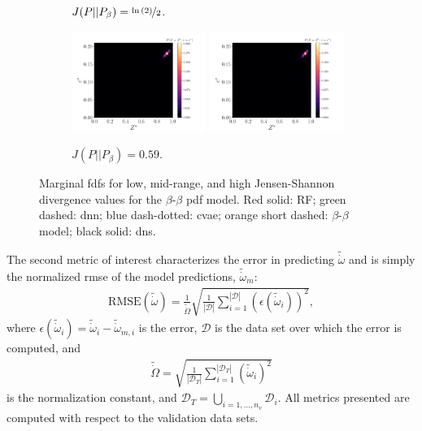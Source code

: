 \documentclass[review]{elsarticle}
\newcommand{\wt}[1]{\widetilde{#1}}
\begin{document}
\begin{figure}[!tbp]
\begin{subfigure}[t]{\textwidth}
    \caption{$J(P||P_{\beta})=\nicefrac{\ln{(2)}}{2}$.}\label{fig:pdfs_hilo_2}%
  \end{subfigure}\hfill%
  \begin{subfigure}[t]{\textwidth}%
    \includegraphics[page=3,width=0.48\textwidth, trim=0.2cm 0cm 1.5cm 1.3cm, clip=true]{./figs/pdfs_14523.pdf}\hfill%
    \includegraphics[page=4,width=0.48\textwidth, trim=0.2cm 0cm 1.5cm 1.3cm, clip=true]{./figs/pdfs_14523.pdf}%
    \caption{$J(P||P_{\beta})=0.59$.}\label{fig:}%
  \end{subfigure}%
  \caption{Marginal \glspl{fdf} for low, mid-range, and high Jensen-Shannon divergence values for the $\beta$-$\beta$ \gls{pdf} model. Red solid: RF; green dashed: \gls{dnn}; blue dash-dotted: \gls{cvae}; orange short dashed: $\beta$-$\beta$ model; black solid: \gls{dns}.}\label{fig:pdfs_hilo}%
\end{figure}%

The second metric of interest characterizes the error in predicting
$\wt{\dot{\omega}}$ and is simply the normalized \gls{rmse} of the model predictions, $\wt{\dot{\omega}}_m$:
\begin{align}
  \label{eq:rmse}
  \text{RMSE}(\wt{\dot{\omega}}) = \frac{1}{\wt{\dot{\Omega}}}\sqrt{ \frac{1}{|\mathcal{D}|}\sum_{i=1}^{|\mathcal{D}|}\left( \epsilon(\wt{\dot{\omega}}_i) \right)^2},
\end{align}
where
$\epsilon(\wt{\dot{\omega}}_i) = \wt{\dot{\omega}}_i -
\wt{\dot{\omega}}_{m,i}$ is the error, $\mathcal{D}$ is the data set
over which the error is computed, and
\begin{align}
  \label{eq:norm}
  \wt{\dot{\Omega}} = \sqrt{\frac{1}{|\mathcal{D}_T|} \sum_{i=1}^{|\mathcal{D}_T|} \left( \wt{\dot{\omega}}_i \right)^2}
\end{align}
is the normalization constant, and
$\mathcal{D}_T = \bigcup\limits_{i=1, \dots, n_v} \mathcal{D}_i$. All metrics
presented are computed with respect to the validation data sets.
\end{document}
